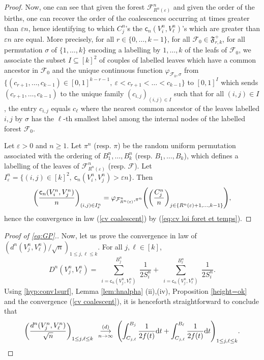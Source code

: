 \documentclass[11pt]{article}
\theoremstyle{plain}
\theoremstyle{definition}
\theoremstyle{remark}
\newcommand{\1}{\mathbbm{1}} %
\newcommand{\e}{\varepsilon} %
\newcommand{\coal}{\mathsf{c}} %
\newcommand{\dc}{D} %
\newcommand{\cvloi}[1][n]{\enskip\mathop{\longrightarrow}^{(d)}_{#1 \to \infty}\enskip}
\let\originalleft\left
\let\originalright\right
\renewcommand{\left}{\mathopen{}\mathclose\bgroup\originalleft}
\renewcommand{\right}{\aftergroup\egroup\originalright}
\begin{document}
\begin{proof}
Now, one can see that given the forest $\mathcal{F}_{R^n(\e)}^n$ and given the order of the births, one can recover the order of the coalescences occurring at times greater than $\e n$, hence identifying to which $C^n_j$'s the $\coal_n(V^n_i,V^n_\ell)$'s which are greater than $\e n$ are equal. More precisely, for all $r \in \{0, \ldots, k-1\}$, for all $\mathcal{F}_0 \in \mathfrak{F}^+_{r,k}$, for all permutation $\sigma$ of $\{1, \ldots, k\}$ encoding a labelling by $1, \ldots, k$ of the leafs of $\mathcal{F}_0$, we associate the subset $I\subseteq [k]^2$ of couples of labelled leaves which have a common ancestor in $\mathcal{F}_0$ and the unique continuous function $\varphi_{\mathcal{F}_0, \sigma}$ from $\{ (c_{r+1}, \ldots, c_{k-1}) \in [0,1]^{k-r-1}, \ \e<c_{r+1} < \ldots <c_{k-1} \}$ to $[0,1]^I$ which sends $(c_{r+1}, \ldots, c_{k-1})$ to the unique family $(c_{i,j})_{(i,j) \in I}$ such that for all $(i,j) \in I$, the entry $c_{i,j}$ equals $c_\ell$ where the nearest common ancestor of the leaves labelled $i,j$ by $\sigma$ has the $\ell$-th smallest label among the internal nodes of the labelled forest $\mathcal{F}_0$.

Let $\e >0$ and $n\ge 1$. Let $\pi^n$ (resp. $\pi$) be the random uniform permutation associated with the ordering of $B^n_1, \ldots, B^n_k$ (resp. $B_1, \ldots, B_k$), which defines a labelling of the leaves of $\mathcal{F}^n_{R^n(\e)}$ (resp. $\mathcal{F}$).  Let $I^n_\e = \{ (i,j) \in [k]^2, \ \coal_n(V^n_i,V^n_j) > \e n\}$. Then
\[
\left(\frac{\coal_n(V^n_i,V^n_j)}{n}\right)_{(i,j) \in I^n_\e}
 = 
\varphi_{\mathcal{F}^n_{R^n(\e)},\pi^n} \left(\left(\frac{C^n_j}{n}\right)_{j \in \{R^n(\e)+1, \ldots, k-1\}}\right),
\]
hence the convergence in law (\ref{cv coalescent}) by (\ref{eq:cv loi foret et temps}).
\end{proof}



\begin{proof}[Proof of  \eqref{eq:GP}.]
Now, let us prove the convergence in law of $(d^n(V_j^n,V_\ell^n)/\sqrt{n})_{1\le j,\ell \le k}$. 
For all $j,\ell \in [k]$,
\[
\dc^n(V_j^n,V_\ell^n) = \sum_{\substack{i=\coal_n(V^n_j, V^n_\ell)}}^{B^n_j} \frac{1}{2S^n_i}
+
\sum_{\substack{i=\coal_n(V^n_j, V^n_\ell)}}^{B^n_\ell} \frac{1}{2S^n_i}.
\]
Using \ref{hyp:conv1surf}, Lemma \ref{lem:hnalpha} (ii),(iv), {Proposition \ref{height=ok}} and the convergence (\ref{cv coalescent}), it is henceforth straightforward to conclude that
\[
\label{eq:cvdn}
\left(\frac{d^n(V_j^n,V_\ell^n)}{\sqrt{n}} \right)_{1\le j,\ell\le k}
\cvloi[n]
\left(\int_{C_{j,\ell}}^{B_j} \frac{1}{2 f(t)} \mathrm{d}t
+\int_{C_{j,\ell}}^{B_\ell} \frac{1}{2 f(t)} \mathrm{d}t
\right)_{1\le j,\ell \le k}.
\]
\end{proof}
\end{document}
